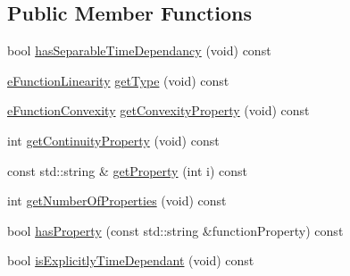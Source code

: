 \subsection*{Public Member Functions}
\begin{DoxyCompactItemize}
\item 
bool \hyperlink{classocra_1_1IFunctionProperties_a1797ae6392475d472bbafe550315ef59}{has\+Separable\+Time\+Dependancy} (void) const 
\end{DoxyCompactItemize}
{\bf }\par
\begin{DoxyCompactItemize}
\item 
\hyperlink{namespaceocra_a87b525b5508b0f6e9d931f14c7c226ab}{e\+Function\+Linearity} \hyperlink{classocra_1_1IFunctionProperties_a5bfbfd2fac36aba69cd7736207ae0dd1}{get\+Type} (void) const 
\item 
\hyperlink{namespaceocra_ae6e8dca6121e9618486a449754876119}{e\+Function\+Convexity} \hyperlink{classocra_1_1IFunctionProperties_aab31c4f7813c57f21c792bd304f3a3d7}{get\+Convexity\+Property} (void) const 
\item 
int \hyperlink{classocra_1_1IFunctionProperties_a5825a0887b43c268a12faad2bd85fd24}{get\+Continuity\+Property} (void) const 
\item 
const std\+::string \& \hyperlink{classocra_1_1IFunctionProperties_ac4519a21eb1ef5b41dd67c9435f32291}{get\+Property} (int i) const 
\item 
int \hyperlink{classocra_1_1IFunctionProperties_a6e674601518d74a4a551c62d44d0e616}{get\+Number\+Of\+Properties} (void) const 
\item 
bool \hyperlink{classocra_1_1IFunctionProperties_a7125d72e667cb6f214c562398a5c4816}{has\+Property} (const std\+::string \&function\+Property) const 
\item 
bool \hyperlink{classocra_1_1IFunctionProperties_a3c67de92306e5d9a0c227a548c081954}{is\+Explicitly\+Time\+Dependant} (void) const 
\end{DoxyCompactItemize}

